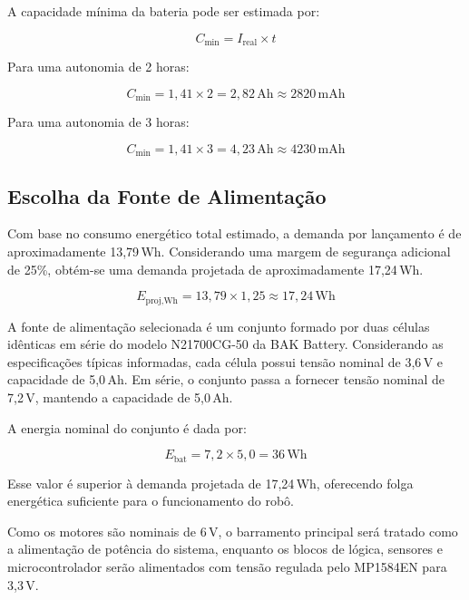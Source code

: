A capacidade mínima da bateria pode ser estimada por:

\begin{equation}
C_{\text{min}}
=
I_{\text{real}} \times t
\end{equation}

Para uma autonomia de 2 horas:

\begin{equation}
C_{\text{min}}
=
1{,}41 \times 2
=
2{,}82\,\mathrm{Ah}
\approx
2820\,\mathrm{mAh}
\end{equation}

Para uma autonomia de 3 horas:

\begin{equation}
C_{\text{min}}
=
1{,}41 \times 3
=
4{,}23\,\mathrm{Ah}
\approx
4230\,\mathrm{mAh}
\end{equation}

\subsection{Escolha da Fonte de Alimentação}
\label{sec:escolha_fonte}

Com base no consumo energético total estimado, a demanda por lançamento é de aproximadamente 13,79\,Wh. Considerando uma margem de segurança adicional de 25\%, obtém-se uma demanda projetada de aproximadamente 17,24\,Wh.

\begin{equation}
E_{\text{proj,Wh}}
=
13{,}79 \times 1{,}25
\approx
17{,}24\,\mathrm{Wh}
\end{equation}

A fonte de alimentação selecionada é um conjunto formado por duas células idênticas em série do modelo N21700CG-50 da BAK Battery. Considerando as especificações típicas informadas, cada célula possui tensão nominal de 3,6\,V e capacidade de 5,0\,Ah. Em série, o conjunto passa a fornecer tensão nominal de 7,2\,V, mantendo a capacidade de 5,0\,Ah.

A energia nominal do conjunto é dada por:

\begin{equation}
E_{\text{bat}}
=
7{,}2 \times 5{,}0
=
36\,\mathrm{Wh}
\end{equation}

Esse valor é superior à demanda projetada de 17,24\,Wh, oferecendo folga energética suficiente para o funcionamento do robô.

Como os motores são nominais de 6\,V, o barramento principal será tratado como a alimentação de potência do sistema, enquanto os blocos de lógica, sensores e microcontrolador serão alimentados com tensão regulada pelo MP1584EN para 3,3\,V.

